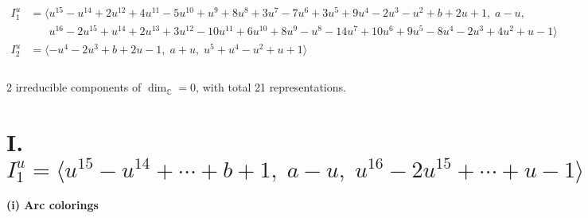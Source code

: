 \documentclass[1p]{elsarticle_modified}
\theoremstyle{definition}
\begin{document}
\begin{align*}
I^u_{1}&=\langle 
u^{15}- u^{14}+2 u^{12}+4 u^{11}-5 u^{10}+u^9+8 u^8+3 u^7-7 u^6+3 u^5+9 u^4-2 u^3- u^2+b+2 u+1,\;a- u,\\
\phantom{I^u_{1}}&\phantom{= \langle  }u^{16}-2 u^{15}+u^{14}+2 u^{13}+3 u^{12}-10 u^{11}+6 u^{10}+8 u^9- u^8-14 u^7+10 u^6+9 u^5-8 u^4-2 u^3+4 u^2+u-1\rangle \\
I^u_{2}&=\langle 
- u^4-2 u^3+b+2 u-1,\;a+u,\;u^5+u^4- u^2+u+1\rangle \\
\\
\end{align*}
\raggedright * 2 irreducible components of $\dim_{\mathbb{C}}=0$, with total 21 representations.\\
\newpage
\renewcommand{\arraystretch}{1}
\centering \section*{I. $I^u_{1}= \langle u^{15}- u^{14}+\cdots+b+1,\;a- u,\;u^{16}-2 u^{15}+\cdots+u-1 \rangle$}
\flushleft \textbf{(i) Arc colorings}\\
\end{document}
